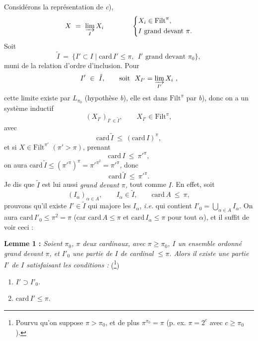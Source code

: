 \documentclass[11pt]{article}
\newcommand{\msp}[1]{\marginpar{\footnotesize [#1]}}
\newcommand{\Filt}{\mathrm{Filt}}
\newcommand{\card}{\mathrm{card}\,}
\begin{document}
Considérons la représentation de \textit{c}),
\[
X \ = \ \varinjlim_{I} X_i \qquad\qquad
\left\{
\begin{aligned}
& X_i \in \Filt^{\pi},\\
& I \text{ grand devant } \pi.
\end{aligned}
\right.
\]
Soit
\[
\tilde{I} \ = \ \{I' \subset I \mid \card I' \leq \pi,\ \ I' \text{ grand devant } \pi_0\},
\]
muni de la relation d'ordre d'inclusion. Pour
\[
I' \ \in\ \tilde{I}, \qquad \text{soit}\ \ X_{I'} = \varinjlim_{I'} X_i\ ,
\]
cette limite existe par $L_{\pi_0}$ (hypothèse \textit{b}), elle est dans $\Filt^{\pi}$ par \textit{b}), donc on a un système inductif
\[
(X_{I'})_{I' \in \tilde{I}}, \qquad X_{I'} \in \Filt^{\pi},
\]
avec
\[
\card \tilde{I} \ \leq\ (\card I)^{\pi},
\]
et si $X \in \Filt^{\pi'}$ $(\pi' > \pi)$, prenant
\[
\card I \ \leq\ \pi'^{\pi},
\]
on aura $\card \tilde{I} \leq (\pi'^{\pi})^{\pi} = \pi'^{\pi^2} = \pi'^{\pi}$, donc
\[
\card \tilde{I} \ \leq\ \pi'^{\pi}.
\]
Je dis que $\tilde{I}$ est lui aussi \textit{grand devant $\pi$,} tout comme $I$. En effet,
\msp{page 80}
soit
\[
(I_\alpha)_{\alpha \in A}, \qquad I_\alpha \in \tilde{I}, \qquad \card A \ \leq\ \pi,
\]
prouvons qu'il existe $I' \in \tilde{I}$ qui majore les $I_\alpha$, \textit{i.e.} qui contient $I'_0 = \bigcup_{\alpha \in A} I_\alpha$. On aura $\card I'_0 \leq \pi^2 = \pi$ (car $\card A \leq \pi$ et $\card I_\alpha \leq \pi$ pour tout $\alpha$), et il suffit de voir ceci :



\textbf{Lemme 1 :} \textit{Soient $\pi_0$, $\pi$ deux cardinaux, avec $\pi \geq \pi_0$, $I$ un ensemble ordonné grand devant $\pi$, et $I'_0$ une partie de $I$ de cardinal $\leq \pi$. Alors il existe une partie $I'$ de $I$ satisfaisant les conditions :} (\footnote[40]{Pourvu qu'on suppose $\pi > \pi_0$, et de plus $\pi^{\pi_0} = \pi$ (p. ex. $\pi = 2^c$ avec $c \geq \pi_0$).})

\begin{enumerate}
\item[a)] $I' \supset I'_0$.
\item[b)] $\card I' \leq \pi$.
\end{enumerate}
\end{document}
